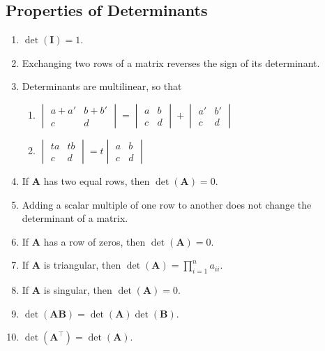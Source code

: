 \documentclass{article}
\begin{document}
\subsection{Properties of Determinants}
\begin{enumerate}
    \item \(\det{\left( \symbf{I} \right)}=1\).
    \item Exchanging two rows of a matrix reverses the sign of its
          determinant.
    \item Determinants are multilinear, so that
          \begin{enumerate}[label=(\alph*)]
              \item \(
                    \begin{vmatrix}
                        a+a' & b+b' \\
                        c    & d
                    \end{vmatrix}
                    =
                    \begin{vmatrix}
                        a & b \\
                        c & d
                    \end{vmatrix}
                    +
                    \begin{vmatrix}
                        a' & b' \\
                        c  & d
                    \end{vmatrix}
                    \)
              \item \(
                    \begin{vmatrix}
                        ta & tb \\
                        c  & d
                    \end{vmatrix}
                    = t
                    \begin{vmatrix}
                        a & b \\
                        c & d
                    \end{vmatrix}
                    \)
          \end{enumerate}
    \item If \(\symbf{A}\) has two equal rows, then
          \(\det{\left( \symbf{A} \right)}=0\).
    \item Adding a scalar multiple of one row to another does not change
          the determinant of a matrix.
    \item If \(\symbf{A}\) has a row of zeros, then
          \(\det{\left( \symbf{A} \right)}=0\).
    \item If \(\symbf{A}\) is triangular, then
          \(\det{\left( \symbf{A} \right)}=\prod_{i=1}^{n} a_{ii}\).
    \item If \(\symbf{A}\) is singular, then
          \(\det{\left( \symbf{A} \right)}=0\).
    \item \(\det{\left( \symbf{A}\symbf{B} \right)}=\det{\left( \symbf{A} \right)}\det{\left( \symbf{B} \right)}\).
    \item \(\det{\left( \symbf{A}^\top \right)}=\det{\left( \symbf{A} \right)}\).
\end{enumerate}
\end{document}
